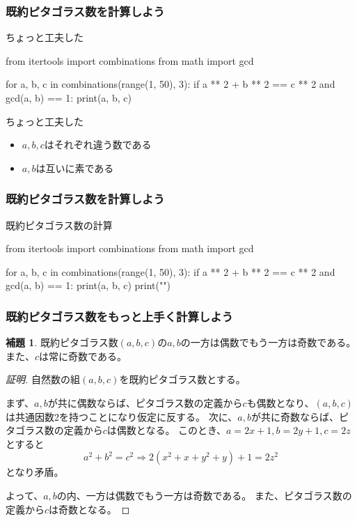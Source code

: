 \documentclass[dvipdfmx,11pt,notheorems]{beamer}
\theoremstyle{definition}
\newtheorem{lemma}{補題}
\begin{document}
\begin{frame}[fragile]\frametitle{既約ピタゴラス数を計算しよう}

\begin{block}{ちょっと工夫した}
\begin{pyverbatim}
from itertools import combinations
from math import gcd

for a, b, c in combinations(range(1, 50), 3):
    if a ** 2 + b ** 2 == c ** 2 and gcd(a, b) == 1:
        print(a, b, c)
\end{pyverbatim}
\end{block}

\begin{block}{ちょっと工夫した}
\begin{itemize}
\item $a,b,c$はそれぞれ違う数である
\item $a,b$は互いに素である
\end{itemize}
\end{block}

\end{frame}

\begin{frame}[fragile]\frametitle{既約ピタゴラス数を計算しよう}

\begin{block}{既約ピタゴラス数の計算}
\begin{pycode}
from itertools import combinations
from math import gcd

for a, b, c in combinations(range(1, 50), 3):
    if a ** 2 + b ** 2 == c ** 2 and gcd(a, b) == 1:
        print(a, b, c)
        print("\n")
\end{pycode}
\end{block}

\end{frame}


\begin{frame}\frametitle{既約ピタゴラス数をもっと上手く計算しよう}

\begin{lemma}
既約ピタゴラス数$(a, b, c)$の$a, b$の一方は偶数でもう一方は奇数である。
また、$c$は常に奇数である。
\end{lemma}

\begin{proof}[証明]
自然数の組$(a, b, c)$を既約ピタゴラス数とする。

まず、$a, b$が共に偶数ならば、ピタゴラス数の定義から$c$も偶数となり、$(a, b, c)$は共通因数2を持つことになり仮定に反する。
次に、$a, b$が共に奇数ならば、ピタゴラス数の定義から$c$は偶数となる。
このとき、$a = 2x + 1, b = 2y + 1, c = 2z$とすると
\begin{equation*}
a^{2} + b^{2} = c^{2} \Rightarrow 2(x^{2} + x + y^{2} + y) + 1 = 2z^{2}
\end{equation*}
となり矛盾。

よって、$a, b$の内、一方は偶数でもう一方は奇数である。
また、ピタゴラス数の定義から$c$は奇数となる。
\end{proof}

\end{frame}
\end{document}
